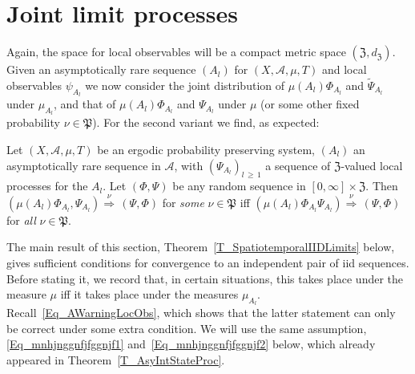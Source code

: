 \documentclass[AHL,Unicode,longabstracts]{cedram}
\newcommand{\clA}{\mathcal{A}}
\newcommand{\frkP}{\mathfrak{P}}
\newcommand{\frkZ}{\mathfrak{Z}}
\begin{document}
\section{Joint limit processes}

Again, the space for local observables will be a compact metric space $(\frkZ,d_{\frkZ})$. Given an asymptotically rare sequence $(A_{l})$ for $(X,\clA,\mu,T)$ and local observables $\psi_{A_{l}}$ we now consider the joint distribution of $\mu(A_{l})\Phi_{A_{l}}$ and $\widetilde{\Psi}_{A_{l}}$ under $\mu_{A_{l}}$, and that of $\mu(A_{l})\Phi_{A_{l}}$ and $\Psi_{A_{l}}$ under $\mu$ (or some other fixed probability $\nu\in\frkP$). For the second variant we find, as expected:

\begin{prop}\label{P_SDCJoint}
Let $(X,\clA,\mu,T)$ be an ergodic probability preserving system, $(A_{l})$ an asymptotically rare sequence in $\clA$, with $(\Psi_{A_{l}})_{l\,\geq\,1}$ a sequence of $\frkZ $-valued local processes for the $A_{l}$. Let $(\Phi,\Psi)$ be any random sequence in $[0,\infty]\times\frkZ$. Then $(\mu(A_{l})\Phi_{A_{l}},\Psi_{A_{l}})\overset{\nu}{\Longrightarrow}\,(\Psi,\Phi)$ for \emph{some} $\nu\in\frkP$ iff $(\mu(A_{l})\Phi_{A_{l}}\Psi_{A_{l}})\overset{\nu }{\Longrightarrow}\,(\Psi,\Phi)$ for \emph{all} $\nu\in\frkP$.
\end{prop}

The main result of this section, Theorem~\ref{T_SpatiotemporalIIDLimits} below, gives sufficient conditions for convergence to an independent pair of iid sequences. Before stating it, we record that, in certain situations, this takes place under the measure $\mu$ iff it takes place under the measures $\mu_{A_{l}}$. Recall~\eqref{Eq_AWarningLocObs}, which shows that the latter statement can only be correct under some extra condition. We will use the same assumption, \eqref{Eq_mnhjnggnfjfggnjf1} and~\eqref{Eq_mnhjnggnfjfggnjf2} below, which already appeared in Theorem~\ref{T_AsyIntStateProc}.
\end{document}
